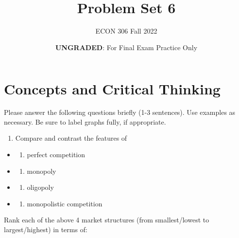 \documentclass[
  11pt,
]{article}
\title{Problem Set 6}
\author{ECON 306 Fall 2022}
\date{\textbf{UNGRADED}: For Final Exam Practice Only}
\providecommand{\tightlist}{%
  \setlength{\itemsep}{0pt}\setlength{\parskip}{0pt}}
\begin{document}
\maketitle

\hypertarget{concepts-and-critical-thinking}{%
\section{Concepts and Critical
Thinking}\label{concepts-and-critical-thinking}}

Please answer the following questions briefly (1-3 sentences). Use
examples as necessary. Be sure to label graphs fully, if appropriate.

\begin{enumerate}
\def\labelenumi{\arabic{enumi}.}
\tightlist
\item
  Compare and contrast the features of
\end{enumerate}

\begin{itemize}
\item
  \begin{enumerate}
  \def\labelenumi{\roman{enumi}.}
  \tightlist
  \item
    perfect competition
  \end{enumerate}
\item
  \begin{enumerate}
  \def\labelenumi{\roman{enumi}.}
  \setcounter{enumi}{1}
  \tightlist
  \item
    monopoly
  \end{enumerate}
\item
  \begin{enumerate}
  \def\labelenumi{\roman{enumi}.}
  \setcounter{enumi}{2}
  \tightlist
  \item
    oligopoly
  \end{enumerate}
\item
  \begin{enumerate}
  \def\labelenumi{\roman{enumi}.}
  \setcounter{enumi}{3}
  \tightlist
  \item
    monopolistic competition
  \end{enumerate}
\end{itemize}

Rank each of the above 4 market structures (from smallest/lowest to
largest/highest) in terms of:
\end{document}

